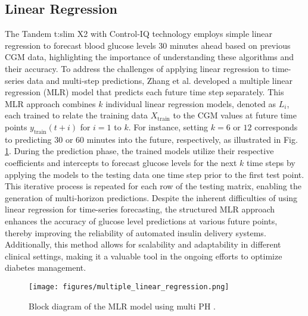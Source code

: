 \subsection{Linear Regression}
The Tandem t:slim X2 with Control-IQ technology employs simple linear regression to forecast blood glucose levels 30 minutes ahead based on previous CGM data, highlighting the importance of understanding these algorithms and their accuracy. To address the challenges of applying linear regression to time-series data and multi-step predictions, Zhang et al. \cite{zhang2021deep} developed a multiple linear regression (MLR) model that predicts each future time step separately. This MLR approach combines \( k \) individual linear regression models, denoted as \( L_i \), each trained to relate the training data \( X_{\text{train}} \) to the CGM values at future time points \( y_{\text{train}}(t + i) \) for \( i = 1 \) to \( k \). For instance, setting \( k = 6 \) or \( 12 \) corresponds to predicting 30 or 60 minutes into the future, respectively, as illustrated in Fig. \ref{fig:multiple_linear_regression}. During the prediction phase, the trained models utilize their respective coefficients and intercepts to forecast glucose levels for the next \( k \) time steps by applying the models to the testing data one time step prior to the first test point. This iterative process is repeated for each row of the testing matrix, enabling the generation of multi-horizon predictions. Despite the inherent difficulties of using linear regression for time-series forecasting, the structured MLR approach enhances the accuracy of glucose level predictions at various future points, thereby improving the reliability of automated insulin delivery systems. Additionally, this method allows for scalability and adaptability in different clinical settings, making it a valuable tool in the ongoing efforts to optimize diabetes management.

\begin{figure}[tb]
\centerline{\texttt{[image: figures/multiple\_linear\_regression.png]}}
\caption{Block diagram of the MLR model using multi PH \cite{zhang2021deep}.}
\label{fig:multiple_linear_regression}
\end{figure}